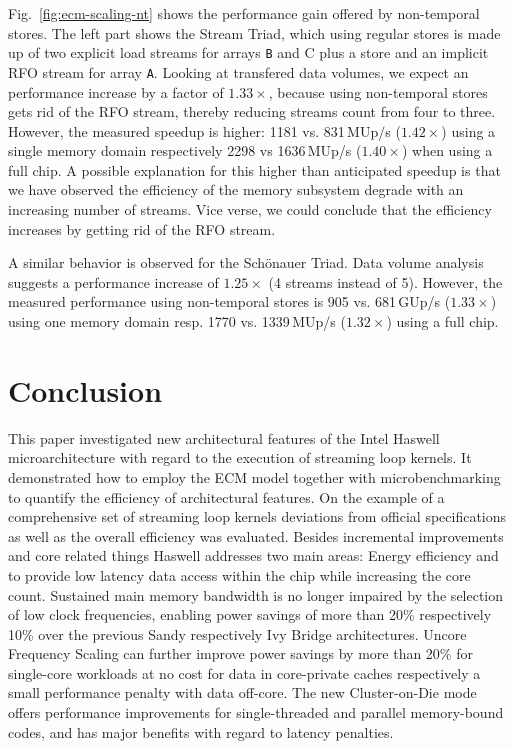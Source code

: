 \documentclass{llncs}
\begin{document}
Fig.~\ref{fig:ecm-scaling-nt} shows the performance gain offered by
non-temporal stores. The left part shows the Stream Triad, which using regular
stores is made up of two explicit load streams for arrays \texttt{B} and {C}
plus a store and an implicit \ac{RFO} stream for array \texttt{A}. Looking at
transfered data volumes, we expect an performance increase by a factor of
$1.33\times$, because using non-temporal stores gets rid of the \ac{RFO}
stream, thereby reducing streams count from four to three.  However, the
measured speedup is higher: 1181 vs.  831\,MUp/s ($1.42\times$) using a single
memory domain respectively 2298 vs 1636\,MUp/s ($1.40\times$) when using a
full chip.  A possible explanation for this higher than anticipated speedup is
that we have observed the efficiency of the memory subsystem degrade with an
increasing number of streams. Vice verse, we could conclude that the efficiency
increases by getting rid of the \ac{RFO} stream.

A similar behavior is observed for the Sch\"onauer Triad. Data volume analysis
suggests a performance increase of $1.25\times$ (4 streams instead of 5).
However, the measured performance using non-temporal stores is 905 vs.
681\,GUp/s ($1.33\times$) using one memory domain resp. 1770 vs.  1339\,MUp/s
($1.32\times$) using a full chip.


\section{Conclusion}
This paper investigated new architectural features of the Intel Haswell
microarchitecture with regard to the execution of streaming loop kernels. It
demonstrated how to employ the \ac{ECM} model together with microbenchmarking
to quantify the efficiency of architectural features. On the example of a
comprehensive set of streaming loop kernels deviations from official
specifications as well as the overall efficiency was evaluated. Besides
incremental improvements and core related things Haswell addresses two main
areas: Energy efficiency and to provide low latency data access within the chip
while increasing the core count.  Sustained main memory bandwidth is no longer
impaired by the selection of low clock frequencies, enabling power savings of
more than 20\% respectively 10\% over the previous Sandy respectively Ivy
Bridge architectures. Uncore Frequency Scaling can further improve power
savings by more than 20\% for single-core workloads at no cost for data in
core-private caches respectively a small performance penalty with data
off-core.  The new Cluster-on-Die mode offers performance improvements for
single-threaded and parallel memory-bound codes, and has major benefits with
regard to latency penalties.



\end{document}

